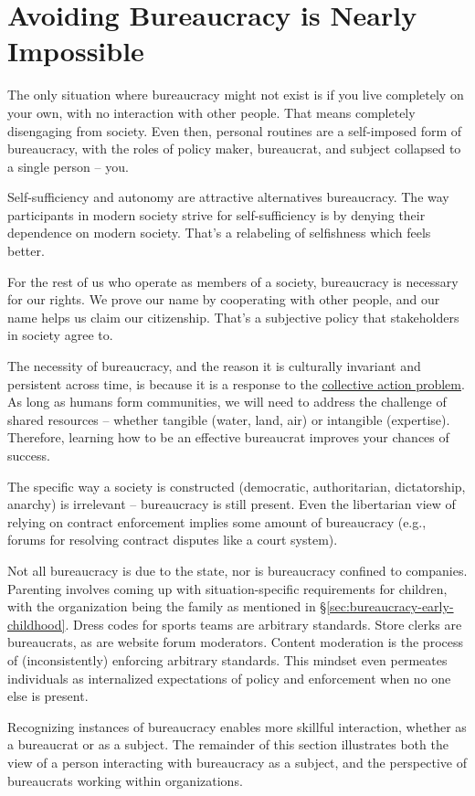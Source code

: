 \section{Avoiding Bureaucracy is Nearly Impossible}

The only situation where bureaucracy might not exist is if you live completely on your own, with no interaction with other people. That means completely disengaging from society. Even then, personal routines are a self-imposed form of bureaucracy, with the roles of policy maker, bureaucrat, and subject collapsed to a single person -- you.

Self-sufficiency and autonomy are attractive alternatives bureaucracy. The way participants in modern society strive for self-sufficiency is by denying their dependence on modern society. That's a relabeling of selfishness which feels better. 

For the rest of us who operate as members of a society, bureaucracy is necessary for our rights. We prove our name by cooperating with other people, and our name helps us claim our citizenship. That's a subjective policy that \glspl{stakeholder} in society agree to. 

The necessity of bureaucracy, and the reason it is culturally invariant and persistent across time, is because it is a response to the 
\href{https://en.wikipedia.org/wiki/Collective_action_problem}{collective action problem}. As long as humans form communities, we will need to address the challenge of shared resources -- whether tangible (water, land, air) or intangible (expertise). Therefore, learning how to be an effective bureaucrat improves your chances of success. 

The specific way a society is constructed (democratic, authoritarian, dictatorship, anarchy) is irrelevant -- bureaucracy is still present. Even the libertarian view of relying on contract enforcement implies some amount of bureaucracy (e.g., forums for resolving contract disputes like a court system). 


Not all bureaucracy is due to the state, nor is bureaucracy confined to companies. Parenting involves coming up with situation-specific requirements for children, with the organization being the family as mentioned in \S\ref{sec:bureaucracy-early-childhood}. Dress codes for sports teams are arbitrary standards. 
Store clerks are bureaucrats, as are website forum moderators.  Content moderation is the process of (inconsistently) enforcing arbitrary standards. This mindset even permeates individuals as internalized expectations of policy and enforcement when no one else is present. 

Recognizing instances of bureaucracy enables more skillful interaction, whether as a bureaucrat or as a subject. The remainder of this section  illustrates both the view of a person interacting with bureaucracy as a \gls{subject}, and the perspective of bureaucrats working within organizations. 




